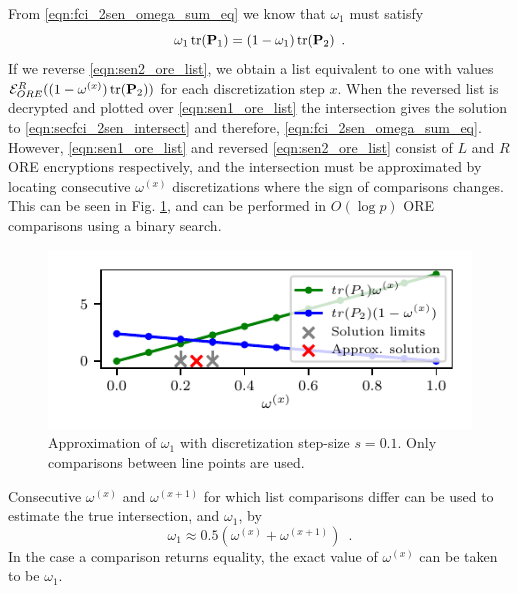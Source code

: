 \documentclass[letterpaper, 10 pt, journal, twoside]{ieeetran}  %
\begin{document}
From \eqref{eqn:fci_2sen_omega_sum_eq} we know that $\omega_1$ must satisfy
\begin{equation}
   \omega_1 \operatorname{tr}({{\mathbf{P}}}_1) = (1-\omega_1)\operatorname{tr}({{\mathbf{P}}}_2)\enspace. \label{eqn:secfci_2sen_intersect}
\end{equation}
If we reverse \eqref{eqn:sen2_ore_list}, we obtain a list equivalent to one with values $\mathcal{E}^R_{ORE}((1-\omega^{(x)})\operatorname{tr}({{\mathbf{P}}}_2))$ for each discretization step $x$. When the reversed list is decrypted and plotted over \eqref{eqn:sen1_ore_list} the intersection gives the solution to \eqref{eqn:secfci_2sen_intersect} and therefore, \eqref{eqn:fci_2sen_omega_sum_eq}. However, \eqref{eqn:sen1_ore_list} and reversed \eqref{eqn:sen2_ore_list} consist of $L$ and $R$ ORE encryptions respectively, and the intersection must be approximated by locating consecutive $\omega^{(x)}$ discretizations where the sign of comparisons changes. This can be seen in Fig. \ref{fig:2_sensor_sol}, and can be performed in $O(\log{p})$ ORE comparisons using a binary search.
\begin{figure}[tb]
   \vspace{-5pt}
   \begin{center}
      \includegraphics{images/2_sensors.pdf}
   \end{center}
   \vspace{-15pt}
   \caption{Approximation of $\omega_1$ with discretization step-size $s=0.1$. Only comparisons between line points are used.}
   \vspace{-\baselineskip}
   \label{fig:2_sensor_sol}
\end{figure}
Consecutive $\omega^{(x)}$ and $\omega^{(x+1)}$ for which list comparisons differ can be used to estimate the true intersection, and $\omega_1$, by
\begin{equation}
   \omega_1 \approx 0.5(\omega^{(x)} + \omega^{(x+1)})\enspace. \label{eqn:secfci_2sen_omega}
\end{equation}
In the case a comparison returns equality, the exact value of $\omega^{(x)}$ can be taken to be $\omega_1$.
\end{document}
